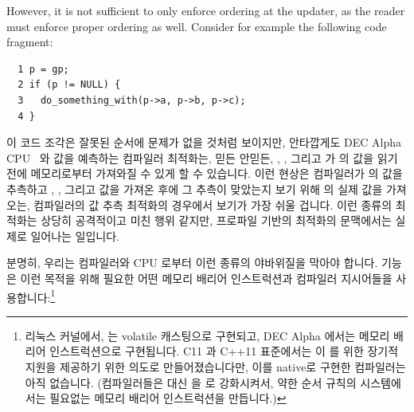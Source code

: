 However, it is not sufficient to only enforce ordering at the
updater, as the reader must enforce proper ordering as well.
Consider for example the following code fragment:
\fi

\vspace{5pt}
\begin{minipage}[t]{\columnwidth}
\scriptsize
\begin{verbatim}
  1 p = gp;
  2 if (p != NULL) {
  3   do_something_with(p->a, p->b, p->c);
  4 }
\end{verbatim}
\end{minipage}
\vspace{5pt}

이 코드 조각은 잘못된 순서에 문제가 없을 것처럼 보이지만, 안타깝게도 DEC Alpha
CPU~\cite{PaulMcKenney2005i,PaulMcKenney2005j} 와 값을 예측하는 컴파일러
최적화는, 믿든 안믿든, , , 그리고  가  의 값을
읽기 전에 메모리로부터 가져와질 수 있게 할 수 있습니다.
이런 현상은 컴파일러가  의 값을 추측하고 , , 그리고
 값을 가져온 후에 그 추측이 맞았는지 보기 위해  의 실제 값을
가져오는, 컴파일러의 값 추측 최적화의 경우에서 보기가 가장 쉬울 겁니다.
이런 종류의 최적화는 상당히 공격적이고 미친 행위 같지만, 프로파일 기반의
최적화의 문맥에서는 실제로 일어나는 일입니다.

분명히, 우리는 컴파일러와 CPU 로부터 이런 종류의 야바위질을 막아야 합니다.
 기능은 이런 목적을 위해 필요한 어떤 메모리 배리어
인스트럭션과 컴파일러 지시어들을 사용합니다:\footnote{
	리눅스 커널에서,  는 volatile 캐스팅으로
	구현되고, DEC Alpha 에서는 메모리 배리어 인스트럭션으로 구현됩니다.
	C11 과 C++11 표준에서는  이
	 를 위한 장기적 지원을 제공하기 위한 의도로
	만들어졌습니다만, 이를 native로 구현한 컴파일러는 아직 없습니다.
	(컴파일러들은 대신  을
	 로 강화시켜서, 약한 순서 규칙의 시스템에서는
	필요없는 메모리 배리어 인스트럭션을 만듭니다.)}
\iffalse

